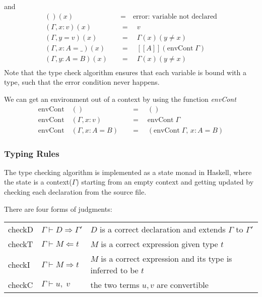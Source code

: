 \documentclass{article}
\theoremstyle{remark}
\begin{document}
and
\begin{align*}
  ()(x) \quad &= \quad \text{error: variable not declared} \\
  (\Gamma, x : v)(x) \quad &= \quad v \\
  (\Gamma, y = v)(x) \quad &= \quad \Gamma(x)(y \neq x) \\
  (\Gamma, x : A = \_)(x) \quad &= \quad [\![A]\!](\text{envCont}\;\Gamma) \\
  (\Gamma, y : A = B)(x) \quad &= \quad \Gamma(x)(y \neq x) \\
\end{align*}
Note that the type check algorithm ensures that each variable is bound with a type, such that the error condition never happens.

We can get an environment out of a context by using the function \textit{envCont}
\begin{align*}
  \text{envCont} \quad () \quad &= \quad () \\
  \text{envCont} \quad (\Gamma, x : v) \quad &= \quad \text{envCont}\;\Gamma \\
  \text{envCont} \quad (\Gamma, x : A = B) \quad &= \quad (\text{envCont}\;\Gamma,\, x : A = B)
\end{align*}

\subsubsection{Typing Rules}
The type checking algorithm is implemented as a state monad in Haskell, where the state is a context($\Gamma$) starting from an empty context and getting updated by checking each declaration from the source file.

There are four forms of judgments:
\begin{table}[h]
  \centering
  \begin{tabular}{l l l}
    checkD & $\Gamma \vdash D \Rightarrow \Gamma'$ & $D$ is a correct declaration and extends $\Gamma$ to $\Gamma'$ \\
    checkT & $\Gamma \vdash M \Leftarrow t $ & $M$ is a correct expression given type $t$ \\
    checkI & $\Gamma \vdash M \Rightarrow t$ & $M$ is a correct expression and its type is inferred to be $t$ \\
    checkC & $\Gamma \vdash u,\; v$ & the two terms $u, v$ are convertible
  \end{tabular}
\end{table}




\end{document}
